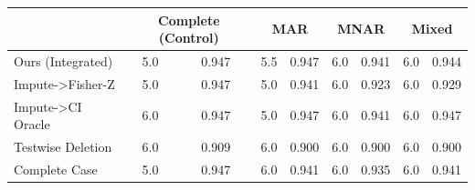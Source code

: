\begin{tabular}{lcccccccc}
\toprule
 & \multicolumn{2}{c}{Complete (Control)} & \multicolumn{2}{c}{MAR} & \multicolumn{2}{c}{MNAR} & \multicolumn{2}{c}{Mixed} \\
\midrule
Ours (Integrated) & 5.0 & 0.947 & 5.5 & 0.947 & 6.0 & 0.941 & 6.0 & 0.944 \\
Impute->Fisher-Z & 5.0 & 0.947 & 5.0 & 0.941 & 6.0 & 0.923 & 6.0 & 0.929 \\
Impute->CI Oracle & 6.0 & 0.947 & 5.0 & 0.947 & 6.0 & 0.941 & 6.0 & 0.947 \\
Testwise Deletion & 6.0 & 0.909 & 6.0 & 0.900 & 6.0 & 0.900 & 6.0 & 0.900 \\
Complete Case & 5.0 & 0.947 & 6.0 & 0.941 & 6.0 & 0.935 & 6.0 & 0.941 \\
\bottomrule
\end{tabular}